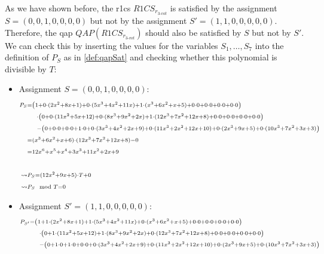 As we have shown before, the \gls{r1cs} $R1CS_{r_{3\text{-}vot}}$ is satisfied by the assignment $S=(0,0,1,0,0,0,0)$ but not by the assignment $S'=(1,1,0,0,0,0,0)$.
Therefore, the \gls{qap} $QAP(R1CS_{r_{3\text{-}vot}})$ should also be satisfied by $S$ but not by $S'$.
We can check this by inserting the values for the variables $S_1,\dots, S_7$ into the definition of $P_S$ as in \cref{def:qapSat} and checking whether this polynomial is divisible by $T$:
\begin{itemize}
    \item Assignment $S=(0,0,1,0,0,0,0)$:
    {\setlength{\mathindent}{0pt}
    \begin{align*}
        \scriptstyle P_S&\scriptstyle=\left(1 + 0\cdot(2x^2+8x+1) + 0\cdot(5x^3+4x^2+11x) + 1\cdot(x^3+6x^2+x+5) + 0\cdot 0 + 0\cdot 0 + 0\cdot 0 + 0\cdot 0\right)\\
        \scriptstyle &\scriptstyle\phantom{=bl}\cdot\left(0 + 0\cdot(11x^2+5x+12) + 0\cdot(8x^3+9x^2+2x) + 1\cdot(12x^3+7x^2+12x+8) + 0\cdot 0 + 0\cdot 0 + 0\cdot 0 + 0\cdot 0\right)\\
        \scriptstyle &\scriptstyle\phantom{=bl}-\left(0 + 0\cdot 0 + 0\cdot 0 + 1\cdot 0 + 0\cdot(3x^3+4x^2+2x+9) + 0\cdot(11x^3+2x^2+12x+10) + 0\cdot(2x^3+9x+5) + 0\cdot(10x^3+7x^2+3x+3)\right)\\
        \scriptstyle &\scriptstyle= (x^3+6x^2+x+6)\cdot(12x^3+7x^2+12x+8)-0\\
        \scriptstyle &\scriptstyle= 12x^6+x^5+x^4+3x^3+11x^2+2x+9\\
        &\\
        \scriptstyle \rightsquigarrow&\scriptstyle P_S = (12 x^{2} + 9 x + 5)\cdot T + 0\\
        \scriptstyle \rightsquigarrow&\scriptstyle P_S\mod T = 0
    \end{align*}
    }
    \item Assignment $S'=(1,1,0,0,0,0,0)$:
    {\setlength{\mathindent}{0pt}
    \begin{align*}
        \scriptstyle P_{S'}&\scriptstyle=\left(1 + 1\cdot(2x^2+8x+1) + 1\cdot(5x^3+4x^2+11x) + 0\cdot(x^3+6x^2+x+5) + 0\cdot 0 + 0\cdot 0 + 0\cdot 0 + 0\cdot 0\right)\\
        \scriptstyle &\scriptstyle\phantom{=bl}\cdot\left(0 + 1\cdot(11x^2+5x+12) + 1\cdot(8x^3+9x^2+2x) + 0\cdot(12x^3+7x^2+12x+8) + 0\cdot 0 + 0\cdot 0 + 0\cdot 0 + 0\cdot 0\right)\\
        \scriptstyle &\scriptstyle\phantom{=bl}-\left(0 + 1\cdot 0 + 1\cdot 0 + 0\cdot 0 + 0\cdot(3x^3+4x^2+2x+9) + 0\cdot(11x^3+2x^2+12x+10) + 0\cdot(2x^3+9x+5) + 0\cdot(10x^3+7x^2+3x+3)\right)\\

\end{align*}}
\end{itemize}
